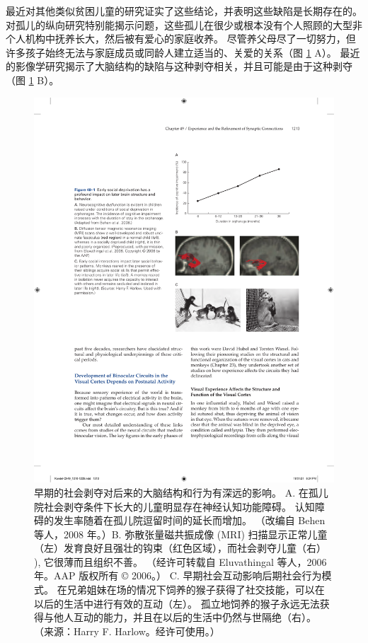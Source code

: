 最近对其他类似贫困儿童的研究证实了这些结论，并表明这些缺陷是长期存在的。 对孤儿的纵向研究特别能揭示问题，这些孤儿在很少或根本没有个人照顾的大型非个人机构中抚养长大，然后被有爱心的家庭收养。 
尽管养父母尽了一切努力，但许多孩子始终无法与家庭成员或同龄人建立适当的、关爱的关系（图 \ref{fig:49_1} A）。 
最近的影像学研究揭示了大脑结构的缺陷与这种剥夺相关，并且可能是由于这种剥夺（图 \ref{fig:49_1} B）。

\begin{figure}[htbp]
	\centering
	\includegraphics[width=0.9\linewidth]{chap49/fig_49_1}
	\caption{早期的社会剥夺对后来的大脑结构和行为有深远的影响。 A. 在孤儿院社会剥夺条件下长大的儿童明显存在神经认知功能障碍。 认知障碍的发生率随着在孤儿院逗留时间的延长而增加。 （改编自 Behen 等人，2008 年。）B. 弥散张量磁共振成像 (MRI) 扫描显示正常儿童（左）发育良好且强壮的钩束（红色区域），而社会剥夺儿童（右） ), 它很薄而且组织不善。 （经许可转载自 Eluvathingal 等人，2006 年。AAP 版权所有 © 2006。） C. 早期社会互动影响后期社会行为模式。 在兄弟姐妹在场的情况下饲养的猴子获得了社交技能，可以在以后的生活中进行有效的互动（左）。 孤立地饲养的猴子永远无法获得与他人互动的能力，并且在以后的生活中仍然与世隔绝（右）。 （来源：Harry F. Harlow。经许可使用。）}
	\label{fig:49_1}
\end{figure}

